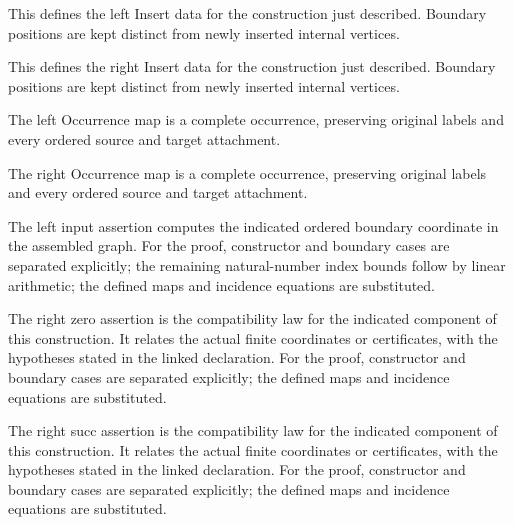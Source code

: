 This defines the left Insert data for the construction just described. Boundary positions are kept distinct from newly inserted internal vertices.
\par{}

This defines the right Insert data for the construction just described. Boundary positions are kept distinct from newly inserted internal vertices.
\par{}

The left Occurrence map is a complete occurrence, preserving original labels and every ordered source and target attachment.
\par{}

The right Occurrence map is a complete occurrence, preserving original labels and every ordered source and target attachment.
\par{}

The left input assertion computes the indicated ordered boundary coordinate in the assembled graph.
For the proof, constructor and boundary cases are separated explicitly; the remaining natural-number index bounds follow by linear arithmetic; the defined maps and incidence equations are substituted.
\par{}

The right zero assertion is the compatibility law for the indicated component of this construction. It relates the actual finite coordinates or certificates, with the hypotheses stated in the linked declaration.
For the proof, constructor and boundary cases are separated explicitly; the defined maps and incidence equations are substituted.
\par{}

The right succ assertion is the compatibility law for the indicated component of this construction. It relates the actual finite coordinates or certificates, with the hypotheses stated in the linked declaration.
For the proof, constructor and boundary cases are separated explicitly; the defined maps and incidence equations are substituted.
\par{}

